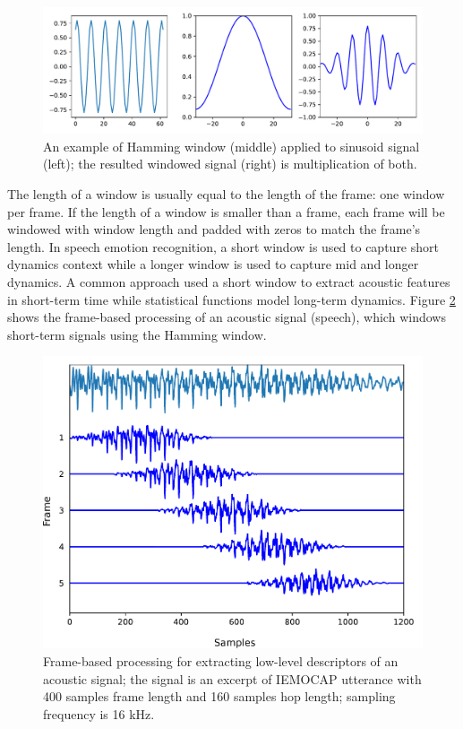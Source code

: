 \begin{figure}[htbp]
  \centering
  \includegraphics[width=\textwidth]{../fig/windowing_demo.pdf}
  \caption{An example of Hamming window (middle) applied to sinusoid signal (left); the resulted windowed signal (right) is multiplication of both.}
  \label{fig:windowing_demo}

\end{figure}
The length of a window is usually equal to the length of the frame: one window
per frame. If the length of a window is smaller than a frame, each frame will
be windowed with window length and padded with zeros to match the frame's
length. In speech emotion recognition, a short window is used to capture short
dynamics context while a longer window is used to capture mid and longer
dynamics. A common approach used a short window to extract acoustic features in
short-term time while statistical functions model long-term dynamics. Figure
\ref{fig:frame-processing} shows the frame-based processing of an acoustic
signal (speech), which windows short-term signals using the Hamming window.

\begin{figure}[htbp]
  \centering
  \includegraphics[width=\textwidth]{../fig/framing.pdf}  
  \caption{Frame-based processing for extracting low-level descriptors of an acoustic signal; the signal is an excerpt of IEMOCAP utterance with 400 samples frame length and 160 samples hop length; sampling frequency is 16 kHz.}
  \label{fig:frame-processing}
\end{figure}

